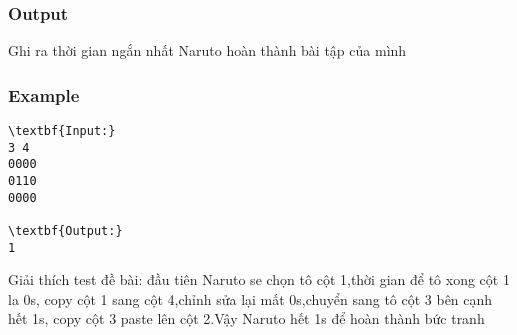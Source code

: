 \subsubsection{   Output  }

   Ghi ra thời gian ngắn nhất Naruto hoàn thành bài tập của mình  

\subsubsection{   Example  }
\begin{verbatim}
\textbf{Input:}
3 4
0000
0110
0000

\textbf{Output:}
1
\end{verbatim}

   Giải thích test đề bài: đầu tiên Naruto se chọn tô cột 1,thời gian để tô xong cột 1 la 0s, copy cột 1 sang cột 4,chỉnh sửa lại mất 0s,chuyển sang tô cột 3 bên cạnh hết 1s, copy cột 3 paste lên cột 2.Vậy Naruto hết 1s để hoàn thành bức tranh  